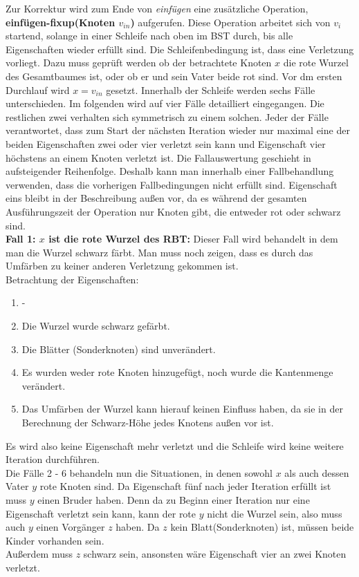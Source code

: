 \documentclass[a4paper,12pt]{article}
\begin{document}
\noindent Zur Korrektur wird zum Ende von \textit{einfügen} eine zusätzliche Operation, \textbf{einfügen-fixup(Knoten $v_{in}$)} aufgerufen. Diese Operation arbeitet sich von $v_i$ startend, solange in einer Schleife nach oben im BST durch, bis alle Eigenschaften wieder erfüllt sind. Die Schleifenbedingung ist, dass eine Verletzung vorliegt. Dazu muss geprüft werden ob der betrachtete Knoten $x$ die rote Wurzel des Gesamtbaumes ist, oder ob er und sein Vater beide rot sind. Vor dm ersten Durchlauf wird $x = v_{in}$ gesetzt. Innerhalb der Schleife werden sechs Fälle unterschieden. Im folgenden wird auf vier Fälle detailliert eingegangen. Die restlichen zwei verhalten sich symmetrisch zu einem solchen. Jeder der Fälle verantwortet, dass zum Start der nächsten Iteration wieder nur maximal eine der beiden Eigenschaften zwei oder vier verletzt sein kann und Eigenschaft vier höchstens an einem Knoten verletzt ist. Die Fallauswertung geschieht in aufsteigender Reihenfolge. Deshalb kann man innerhalb einer Fallbehandlung verwenden, dass die vorherigen Fallbedingungen nicht erfüllt sind. Eigenschaft eins bleibt in der Beschreibung außen vor, da es während der gesamten Ausführungszeit der Operation nur Knoten gibt, die entweder rot oder schwarz sind. \\

\noindent\textbf{Fall 1: $x$ ist die rote Wurzel des RBT: }
Dieser Fall wird behandelt in dem man die Wurzel schwarz färbt. Man muss noch zeigen, dass es durch das Umfärben zu keiner anderen Verletzung gekommen ist.\\

Betrachtung der Eigenschaften:
\begin{enumerate}
	\item -
	\item Die Wurzel wurde schwarz gefärbt.
	\item Die Blätter (Sonderknoten) sind unverändert.
	\item Es wurden weder rote Knoten hinzugefügt, noch wurde die Kantenmenge verändert. 
	\item Das Umfärben der Wurzel kann hierauf keinen Einfluss haben, da sie in der Berechnung der Schwarz-Höhe jedes Knotens außen vor ist.
\end{enumerate}  

\noindent Es wird also keine Eigenschaft mehr verletzt und die Schleife wird keine weitere Iteration durchführen.\\
Die Fälle 2 - 6 behandeln nun die Situationen, in denen sowohl $x$ als auch dessen Vater $y$ rote Knoten sind. Da Eigenschaft fünf nach jeder Iteration erfüllt ist muss $y$ einen Bruder haben. Denn da zu Beginn einer Iteration nur eine Eigenschaft verletzt sein kann, kann der rote $y$ nicht die Wurzel sein, also muss auch $y$ einen Vorgänger $z$ haben. Da $z$ kein Blatt(Sonderknoten) ist, müssen beide Kinder vorhanden sein.\\
Außerdem muss $z$ schwarz sein, ansonsten wäre Eigenschaft vier an zwei Knoten verletzt.\\
\end{document}
